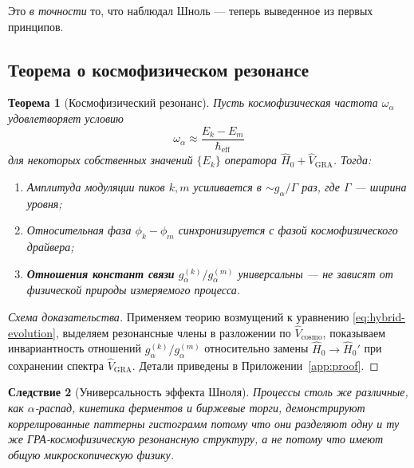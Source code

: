 \documentclass[12pt,a4paper]{article}
\theoremstyle{plain}
\newtheorem{theorem}{Теорема}[section]
\newtheorem{corollary}[theorem]{Следствие}
\theoremstyle{definition}
\theoremstyle{remark}
\newcommand{\GRA}{\text{GRA}}
\newcommand{\eff}{\text{eff}}
\newcommand{\cosmo}{\text{cosmo}}
\begin{document}
Это \emph{в точности} то, что наблюдал Шноль --- теперь выведенное из первых принципов.

\subsection{Теорема о космофизическом резонансе}

\begin{theorem}[Космофизический резонанс]
\label{thm:resonance}
Пусть космофизическая частота $\omega_{\alpha}$ удовлетворяет условию
\begin{equation}
\omega_{\alpha} \approx \frac{E_k - E_m}{\hbar_{\eff}}
\label{eq:resonance-condition}
\end{equation}
для некоторых собственных значений $\{E_k\}$ оператора $\hat{H}_0 + \hat{V}_{\GRA}$. Тогда:
\begin{enumerate}
    \item Амплитуда модуляции пиков $k,m$ усиливается в $\sim g_{\alpha}/\Gamma$ раз, где $\Gamma$ --- ширина уровня;
    \item Относительная фаза $\phi_k - \phi_m$ синхронизируется с фазой космофизического драйвера;
    \item \textbf{Отношения констант связи} $g_{\alpha}^{(k)}/g_{\alpha}^{(m)}$ \emph{универсальны} --- не зависят от физической природы измеряемого процесса.
\end{enumerate}
\end{theorem}

\begin{proof}[Схема доказательства]
Применяем теорию возмущений к уравнению \eqref{eq:hybrid-evolution}, выделяем резонансные члены в разложении по $\hat{V}_{\cosmo}$, показываем инвариантность отношений $g_{\alpha}^{(k)}/g_{\alpha}^{(m)}$ относительно замены $\hat{H}_0 \to \hat{H}_0'$ при сохранении спектра $\hat{V}_{\GRA}$. Детали приведены в Приложении~\ref{app:proof}.
\end{proof}

\begin{corollary}[Универсальность эффекта Шноля]
Процессы столь же различные, как $\alpha$-распад, кинетика ферментов и биржевые торги, демонстрируют коррелированные паттерны гистограмм \emph{потому что они разделяют одну и ту же ГРА-космофизическую резонансную структуру}, а не потому что имеют общую микроскопическую физику.
\end{corollary}

\end{document}
